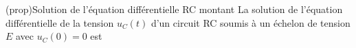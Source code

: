\documentclass[../../main/main.tex]{subfiles}
\begin{document}
\begin{tcb}[label=prop:ucsolu, sidebyside, righthand ratio=.4](prop){Solution
			de l'équation différentielle RC montant}
	La solution de l'équation différentielle de la tension $u_C(t)$
	d'un circuit RC soumis à un échelon de tension $E$ avec
	$u_C(0) = 0$ est
	\psw{
		\[
			\boxed{u_C(t) = E\left(1-\exp\left(-\frac{t}{\tau}\right)\right)}
		\]
	}
	\vspace{-15pt}
	\tcblower
	\begin{center}
	\end{center}
\end{tcb}
\end{document}
